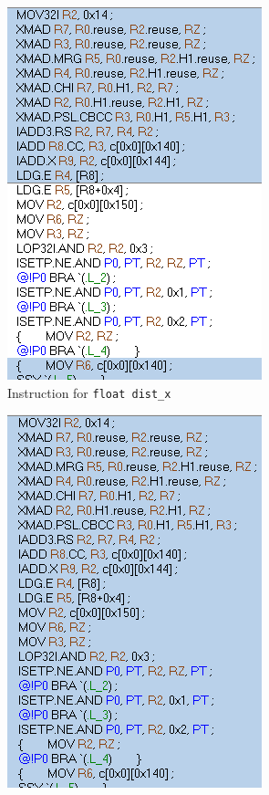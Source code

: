 \documentclass[12pt, a4paper]{article}
\begin{document}
\begin{figure}[ht]
  \begin{subfigure}{.5\textwidth}
    \centering
    \includegraphics[width=.8\linewidth]{images/cuda_vector_type_before.png}
    \caption{Instruction for \texttt{float dist_x}}
  \end{subfigure}
  \begin{subfigure}{.5\textwidth}
    \centering
    \includegraphics[width=.8\linewidth]{images/cuda_vector_type_after.png}

\end{subfigure}
\end{figure}
\end{document}
